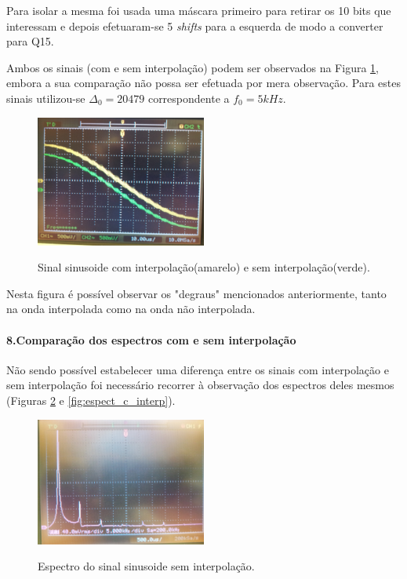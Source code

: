 \documentclass[11pt]{article}
\numberwithin{equation}{section}
\begin{document}
Para isolar a mesma foi usada uma máscara primeiro para retirar os 10 bits que interessam e depois efetuaram-se 5 \textit{shifts} para a esquerda de modo a converter para Q15.

Ambos os sinais (com e sem interpolação) podem ser observados na Figura \ref{fig:interp}, embora a sua comparação não possa ser efetuada por mera observação. Para estes sinais utilizou-se $\Delta_0=20479$ correspondente a $f_0=5kHz$.
\begin{figure}[H]
	\centering                                          
	\includegraphics[width=0.5\textwidth]{./P1_interp}~\\
	\caption{Sinal sinusoide com interpolação(amarelo) e sem interpolação(verde).}
	\label{fig:interp}
\end{figure} 
Nesta figura é possível observar os "degraus" mencionados anteriormente, tanto na onda interpolada como na onda não interpolada.

\paragraph{8.Comparação dos espectros com e sem interpolação} \hspace{0pt}

Não sendo possível estabelecer uma diferença entre os sinais com interpolação e sem interpolação foi necessário recorrer à observação dos espectros deles mesmos (Figuras \ref{fig:espect_s_interp} e \ref{fig:espect_c_interp}).
\begin{figure}[H]
	\centering
	\includegraphics[width=0.5\textwidth]{./P1-8_espect_s_interp}~\\
	\caption{Espectro do sinal sinusoide sem interpolação.}
	\label{fig:espect_s_interp}
\end{figure}
\end{document}
